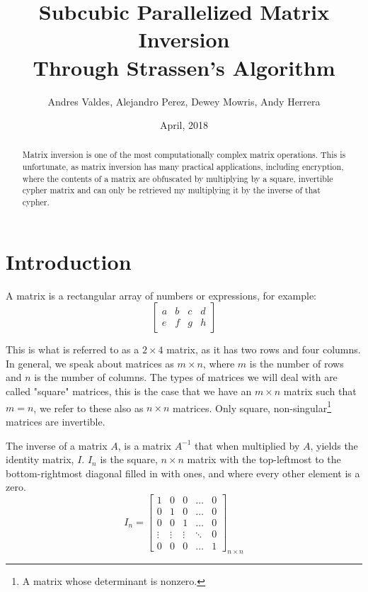 \documentclass[12pt, letterpaper]{article}
\title{Subcubic Parallelized Matrix Inversion \\
	\large Through Strassen's Algorithm}
\author{Andres Valdes, Alejandro Perez, Dewey Mowris, Andy Herrera}
\date{April, 2018}
\theoremstyle{remark}
\theoremstyle{remark}
\begin{document}
    \begin{titlepage}
        \maketitle
        \thispagestyle{empty}

    \end{titlepage}

    \begin{abstract}
        
        Matrix inversion is one of the most computationally complex 
        matrix operations. This is unfortunate, as matrix inversion 
        has many practical applications, including encryption, where the 
        contents of a matrix are obfuscated by multiplying by a square,
        invertible cypher matrix and can only be retrieved my multiplying
        it by the inverse of that cypher.

    \end{abstract}

    \pagebreak

    \section{Introduction}

    \noindent 
    A matrix is a rectangular array of numbers or expressions, for example: 
    \[\begin{bmatrix*}
        a & b & c & d \\
        e & f & g & h
    \end{bmatrix*}\]

    This is what is referred to as a \(2\times{4}\) matrix, as it 
    has two rows and four columns. In general, we speak about matrices as 
    \(m\times{n}\), where \(m\) is the number of rows and \(n\) is the number 
    of columns. The types of matrices we will deal with are called "square" 
    matrices, this is the case that we have an \(m\times{n}\) matrix such that 
    \(m = n\), we refer to these also as \(n\times{n}\) matrices. Only square, 
    non-singular\footnote{A matrix whose determinant is nonzero.} 
    matrices are invertible.

    The inverse of a matrix \(A\), is a matrix \(A^{-1}\) that when multiplied by \(A\), 
    yields the identity matrix, \(I\). \(I_n\) is the square, \(n\times{n}\) 
    matrix with the top-leftmost to the bottom-rightmost diagonal filled in 
    with ones, and where every other element is a zero.
    \[I_n = \begin{bmatrix*}
        1 & 0 & 0 & \dots & 0 \\
        0 & 1 & 0 & \dots & 0 \\
        0 & 0 & 1 & \dots & 0 \\
        \vdots & \vdots & \vdots & \ddots & 0 \\
        0 & 0 & 0 & \dots & 1
    \end{bmatrix*}_{n\times n}\]
\end{document}
